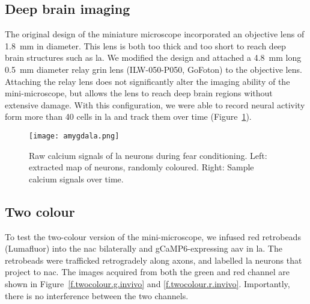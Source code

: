 \subsection{Deep brain imaging}
The original design of the miniature microscope incorporated an objective lens of \SI{1.8}{\mm} in diameter. This lens is both too thick and too short to reach deep brain structures such as \gls{la}. We modified the design and attached a \SI{4.8}{\mm} long \SI{0.5}{\mm} diameter relay \gls{grin} lens (ILW-050-P050, GoFoton) to the objective lens. Attaching the relay lens does not significantly alter the imaging ability of the mini-microscope, but allows the lens to reach deep brain regions without extensive damage. With this configuration, we were able to record neural activity form more than 40 cells in \gls{la} and track them over time (Figure~\ref{f.amygdala}).
\begin{figure}[h]
    \centering
    \texttt{[image: amygdala.png]}
    \caption[Calcium imaging in \gls{la} during fear conditioning.]{Raw calcium signals of \gls{la} neurons during fear conditioning. Left: extracted map of neurons, randomly coloured. Right: Sample calcium signals over time.\label{f.amygdala}}

\end{figure}

\subsection{Two colour}
To test the two-colour version of the mini-microscope, we infused red retrobeads (Lumafluor) into the \gls{nac} bilaterally and gCaMP6-expressing \gls{aav} in \gls{la}. The retrobeads were trafficked retrogradely along axons, and labelled \gls{la} neurons that project to \gls{nac}. The images acquired from both the green and red channel are shown in Figure~\ref{f.twocolour.g.invivo} and \ref{f.twocolour.r.invivo}. Importantly, there is no interference between the two channels.

